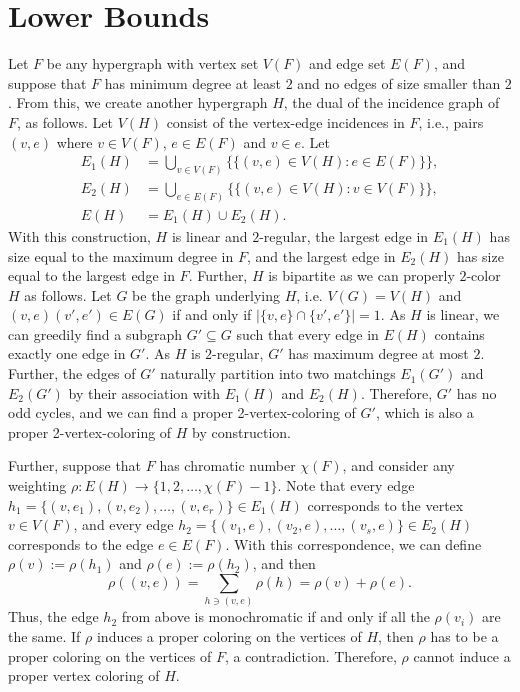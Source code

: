 \documentclass[reqno,12pt,epsf]{amsart}
\def\omm{\rho}
\begin{document}
\section{Lower Bounds}
Let $F$ be any hypergraph with vertex set $V(F)$ and edge set $E(F)$, and suppose that $F$ has minimum degree at least $2$ and no edges of size smaller than $2$. From this, we create another hypergraph $H$, the dual of the incidence graph of $F$, as follows. Let $V(H)$ consist of the vertex-edge incidences in $F$, i.e., pairs $(v,e)$ where $v\in V(F)$, $e\in E(F)$ and $v\in e$. Let 
\begin{align*}
E_1(H)&= \bigcup_{v\in V(F)}\{\{(v,e)\in V(H):e\in E(F)\}\},\\
E_2(H)&= \bigcup_{e\in E(F)}\{\{(v,e)\in V(H):v\in V(F)\}\},\\
E(H)&=E_1(H)\cup E_2(H).
\end{align*}
With this construction, $H$ is linear and $2$-regular, the largest edge in $E_1(H)$ has size equal to the maximum degree in $F$, and the largest edge in $E_2(H)$ has size equal to the largest edge in $F$. 
%
Further, $H$ is bipartite as we can properly $2$-color $H$ as follows. Let $G$ be the graph underlying $H$, i.e. $V(G)=V(H)$ and $(v,e)(v',e')\in E(G)$ if and only if $|\{v,e\}\cap\{v',e'\}|=1$. As $H$ is linear, we can greedily find a subgraph $G'\subseteq G$ such that every edge in $E(H)$ contains exactly one edge in $G'$. As $H$ is $2$-regular, $G'$ has maximum degree at most $2$. Further, the edges of $G'$ naturally partition into two matchings $E_1(G')$ and $E_2(G')$ by their association with $E_1(H)$ and $E_2(H)$. Therefore, $G'$ has no odd cycles, and we can find a proper 2-vertex-coloring of $G'$, which is also a proper 2-vertex-coloring of $H$ by construction.

Further, suppose that $F$ has chromatic number $\chi(F)$, and consider any weighting $\omm: E(H)\to \{1,2,\ldots,\chi(F)-1\}$.  
Note that every edge $h_1=\{(v,e_1),(v,e_2),\ldots,(v,e_r)\}\in E_1(H)$ corresponds to the vertex $v\in V(F)$, and every edge 
$h_2=\{(v_1,e),(v_2,e),\ldots,(v_s,e)\}\in E_2(H)$ corresponds to the edge $e\in E(F)$. With this correspondence, we can define 
$\omm(v):=\omm(h_1)$ and $\omm(e):=\omm(h_2)$, and then
\[
\omm((v,e))=\sum_{h\ni (v,e)}\omm(h)=\omm(v)+\omm(e).
\]
Thus, the edge $h_2$ from above is monochromatic if and only if all the $\omm(v_i)$ are the same. If $\omm$ induces a proper coloring on the vertices of $H$, then $\omm$ has to be a proper coloring on the vertices of $F$, a contradiction. Therefore, $\omm$ cannot induce a proper vertex coloring of $H$.
\end{document}

